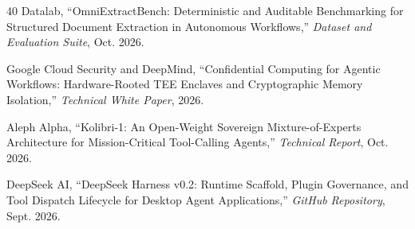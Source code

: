 \documentclass[10pt,journal,compsoc]{IEEEtran}
\begin{document}
\begin{thebibliography}{40}
Datalab, ``OmniExtractBench: Deterministic and Auditable Benchmarking for Structured Document Extraction in Autonomous Workflows,'' \emph{Dataset and Evaluation Suite}, Oct. 2026.

Google Cloud Security and DeepMind, ``Confidential Computing for Agentic Workflows: Hardware-Rooted TEE Enclaves and Cryptographic Memory Isolation,'' \emph{Technical White Paper}, 2026.

Aleph Alpha, ``Kolibri-1: An Open-Weight Sovereign Mixture-of-Experts Architecture for Mission-Critical Tool-Calling Agents,'' \emph{Technical Report}, Oct. 2026.

DeepSeek AI, ``DeepSeek Harness v0.2: Runtime Scaffold, Plugin Governance, and Tool Dispatch Lifecycle for Desktop Agent Applications,'' \emph{GitHub Repository}, Sept. 2026.

\end{thebibliography}
\end{document}

